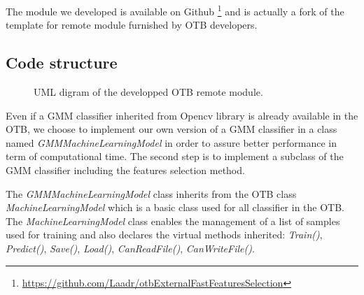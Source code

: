\documentclass[a4paper,11pt,DIV=16]{scrartcl}
\begin{document}
        The module we developed is available on Github \footnote{\url{https://github.com/Laadr/otbExternalFastFeaturesSelection}} and is actually a fork of the template for remote module furnished by OTB developers.

        \subsection{Code structure}

        \begin{figure}[!ht]
            \centering
            \caption{UML digram of the developped OTB remote module.\label{fig:uml}}
        \end{figure}

        Even if a GMM classifier inherited from Opencv library is already available in the OTB, we choose to implement our own version of a GMM classifier in a class named \emph{GMMMachineLearningModel} in order to assure better performance in term of computational time. The second step is to implement a subclass of the GMM classifier including the features selection method.

        The \emph{GMMMachineLearningModel} class inherits from the OTB class \emph{MachineLearningModel} which is a basic class used for all classifier in the OTB. The \emph{MachineLearningModel} class enables the management of a list of samples used for training and also declares the virtual methods inherited: \emph{Train()}, \emph{Predict()}, \emph{Save()}, \emph{Load()}, \emph{CanReadFile()}, \emph{CanWriteFile()}.
\end{document}
